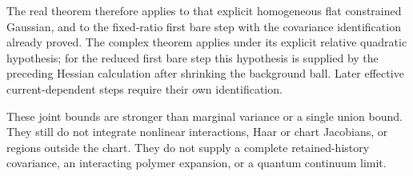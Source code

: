 \documentclass[11pt]{article}
\theoremstyle{remark}\newtheorem{remark}[theorem]{Remark}
\begin{document}
The real theorem therefore applies to that explicit homogeneous
flat constrained Gaussian, and to the fixed-ratio first bare
step with the covariance identification already proved. The
complex theorem applies under its explicit relative quadratic
hypothesis; for the reduced first bare step this hypothesis is
supplied by the preceding Hessian calculation after shrinking
the background ball. Later effective current-dependent steps
require their own identification.

These joint bounds are stronger than marginal variance or a
single union bound. They still do not integrate nonlinear
interactions, Haar or chart Jacobians, or regions outside the
chart. They do not supply a complete retained-history covariance,
an interacting polymer expansion, or a quantum continuum limit.
\end{document}
